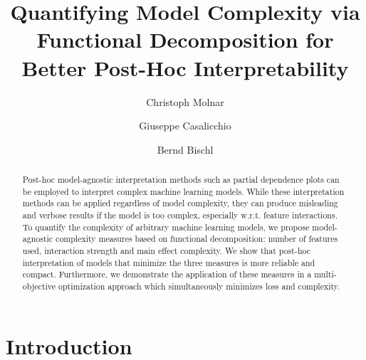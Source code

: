 \documentclass[runningheads]{llncs}\usepackage[]{graphicx}\usepackage[]{color}
\begin{document}
\title{Quantifying Model Complexity via Functional Decomposition for Better Post-Hoc Interpretability}

\author{
	Christoph Molnar %
	\and Giuseppe Casalicchio %
	\and Bernd Bischl %
}


\maketitle

\begin{abstract}
Post-hoc model-agnostic interpretation methods such as partial dependence plots can be employed to interpret complex machine learning models.
While these interpretation methods can be applied regardless of model complexity, they can produce misleading and verbose results if the model is too complex, especially w.r.t. feature interactions.
To quantify the complexity of arbitrary machine learning models, we propose model-agnostic complexity measures based on functional decomposition: number of features used, interaction strength and main effect complexity.
We show that post-hoc interpretation of models that minimize the three measures is more reliable and compact.
Furthermore, we demonstrate the application of these measures in a multi-objective optimization approach which simultaneously minimizes loss and complexity.
\end{abstract}




\section{Introduction}
\label{sec:introduction}
\end{document}
